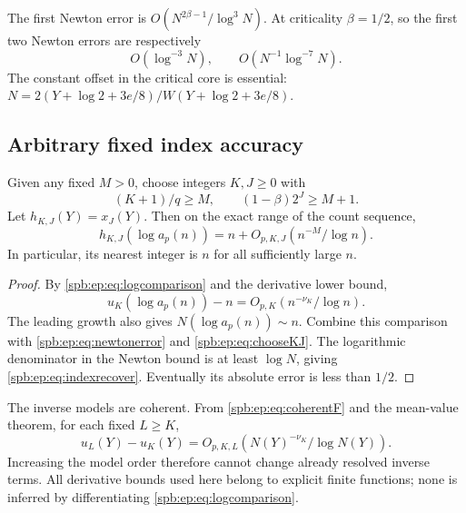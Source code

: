 The first Newton error is $O(N^{2\beta-1}/\log^3N)$.
At criticality $\beta=1/2$, so the first two Newton errors are respectively
\begin{equation}\label{spb:ep:eq:criticalNewton}
 O(\log^{-3}N),\qquad O(N^{-1}\log^{-7}N).
\end{equation}
The constant offset in the critical core is essential:
$N=2(Y+\log2+3e/8)/W(Y+\log2+3e/8)$.

\subsection{Arbitrary fixed index accuracy}
\begin{corollary}\label{spb:ep:cor:index}
Given any fixed $M>0$, choose integers $K,J\ge0$ with
\begin{equation}\label{spb:ep:eq:chooseKJ}
 (K+1)/q\ge M,\qquad (1-\beta)2^J\ge M+1.
\end{equation}
Let $h_{K,J}(Y)=x_J(Y)$. Then on the exact range of the count sequence,
\begin{equation}\label{spb:ep:eq:indexrecover}
 h_{K,J}(\log a_p(n))=n+O_{p,K,J}(n^{-M}/\log n).
\end{equation}
In particular, its nearest integer is $n$ for all sufficiently large $n$.
\end{corollary}
\begin{proof}
By \eqref{spb:ep:eq:logcomparison} and the derivative lower bound,
\[
 u_K(\log a_p(n))-n=O_{p,K}(n^{-\nu_K}/\log n).
\]
The leading growth also gives $N(\log a_p(n))\sim n$.
Combine this comparison with \eqref{spb:ep:eq:newtonerror} and
\eqref{spb:ep:eq:chooseKJ}. The logarithmic denominator in the Newton bound
is at least $\log N$, giving \eqref{spb:ep:eq:indexrecover}.
Eventually its absolute error is less than $1/2$.
\end{proof}

The inverse models are coherent. From \eqref{spb:ep:eq:coherentF} and the
mean-value theorem, for each fixed $L\ge K$,
\begin{equation}\label{spb:ep:eq:inversecoherent}
 u_L(Y)-u_K(Y)=O_{p,K,L}(N(Y)^{-\nu_K}/\log N(Y)).
\end{equation}
Increasing the model order therefore cannot change already resolved inverse
terms. All derivative bounds used here belong to explicit finite functions;
none is inferred by differentiating \eqref{spb:ep:eq:logcomparison}.

